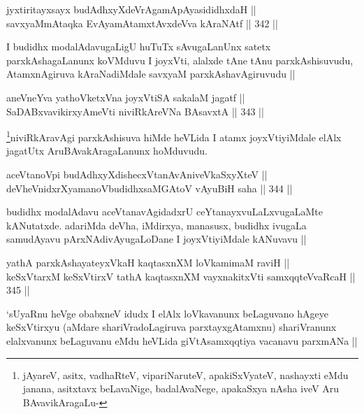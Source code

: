 \begin{shl}
jyxtiritayxsayx budAdhxyXdeVrAgamApAyasididhxdaH || \\
savxyaMmAtaqka EvAyamAtamxtAvxdeVva kAraNAtf ||  342 ||  
\end{shl}

\begin{artha}
I budidhx modalAdavugaLigU huTuTx sAvugaLanUnx satetx parxkAshagaLanunx koVMduvu I joyxVti, alalxde tAne tAnu parxkAshisuvudu, AtamxnAgiruva kAraNadiMdale savxyaM parxkAshavAgiruvudu ||
\end{artha}

\begin{shl}
aneVneYva yathoVketxVna joyxVtiSA sakalaM jagatf || \\
SaDABxvavikirxyAmeVti niviRkAreVNa BAsavxtA ||  343 || 
\end{shl}

\begin{artha}
\footnote{jAyareV, asitx, vadhaRteV, vipariNaruteV, apakiSxVyateV, nashayxti eMdu janana, asitxtavx beLavaNige, badalAvaNege, apakaSxya nAsha iveV Aru BAvavikAragaLu-}niviRkAravAgi parxkAshisuva hiMde heVLida I atamx joyxVtiyiMdale elAlx jagatUtx AruBAvakAragaLanunx hoMduvudu.
\end{artha}


\begin{shl}
aceVtanoV\s pi budAdhxyXdishecxVtanAvAniveVkaSxyXteV ||  \\
deVheVnidxrXyamanoVbudidhxsaMGAtoV vAyuBiH saha ||  344 ||  
\end{shl}

\begin{artha}
budidhx modalAdavu aceVtanavAgidadxrU ceYtanayxvuLaLxvugaLaMte kANutatxde. adariMda deVha, iMdirxya, manasusx, budidhx ivugaLa samudAyavu pArxNAdivAyugaLoDane I joyxVtiyiMdale kANuvavu ||
\end{artha}


\begin{shl}
yathA parxkAshayateyxVkaH kaqtasxnXM loVkamimaM raviH || \\
keSxVtarxM keSxVtirxV tathA kaqtasxnXM vayxnakitxVti samxqqteVvaRcaH ||  345 ||  
\end{shl}

\begin{artha}
`sUyaRnu heVge obabxneV idudx I elAlx loVkavanunx beLaguvano hAgeye keSxVtirxyu (aMdare shariVradoLagiruva parxtayxgAtamxnu) shariVranunx elalxvanunx beLaguvanu eMdu heVLida giVtAsamxqqtiya vacanavu parxmANa ||
\end{artha}

